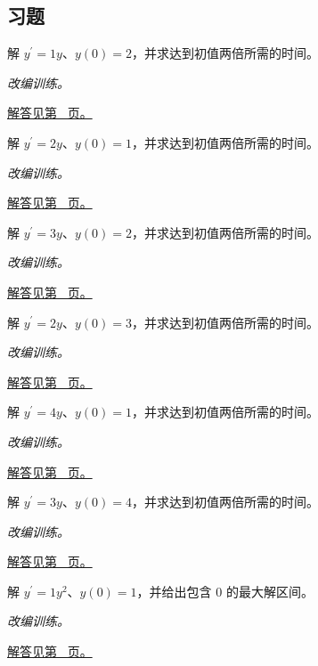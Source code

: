 \documentclass[UTF8,12pt,a4paper,fontset=fandol]{ctexart}
\begin{document}
\subsection{习题}
\begin{example}[指数增长初值问题]\label{ex:c22q1}
解 $y^{\prime}=1y$、$y(0)=2$，并求达到初值两倍所需的时间。
\par\textit{改编训练。}\par\hyperref[ans:c22q1]{解答见第~\pageref{ans:c22q1} 页。}
\end{example}
\begin{example}[指数增长初值问题]\label{ex:c22q2}
解 $y^{\prime}=2y$、$y(0)=1$，并求达到初值两倍所需的时间。
\par\textit{改编训练。}\par\hyperref[ans:c22q2]{解答见第~\pageref{ans:c22q2} 页。}
\end{example}
\begin{example}[指数增长初值问题]\label{ex:c22q3}
解 $y^{\prime}=3y$、$y(0)=2$，并求达到初值两倍所需的时间。
\par\textit{改编训练。}\par\hyperref[ans:c22q3]{解答见第~\pageref{ans:c22q3} 页。}
\end{example}
\begin{example}[指数增长初值问题]\label{ex:c22q4}
解 $y^{\prime}=2y$、$y(0)=3$，并求达到初值两倍所需的时间。
\par\textit{改编训练。}\par\hyperref[ans:c22q4]{解答见第~\pageref{ans:c22q4} 页。}
\end{example}
\begin{example}[指数增长初值问题]\label{ex:c22q5}
解 $y^{\prime}=4y$、$y(0)=1$，并求达到初值两倍所需的时间。
\par\textit{改编训练。}\par\hyperref[ans:c22q5]{解答见第~\pageref{ans:c22q5} 页。}
\end{example}
\begin{example}[指数增长初值问题]\label{ex:c22q6}
解 $y^{\prime}=3y$、$y(0)=4$，并求达到初值两倍所需的时间。
\par\textit{改编训练。}\par\hyperref[ans:c22q6]{解答见第~\pageref{ans:c22q6} 页。}
\end{example}
\begin{example}[分离变量与有限时刻发散]\label{ex:c22q7}
解 $y^{\prime}=1y^2$、$y(0)=1$，并给出包含 $0$ 的最大解区间。
\par\textit{改编训练。}\par\hyperref[ans:c22q7]{解答见第~\pageref{ans:c22q7} 页。}
\end{example}
\end{document}
